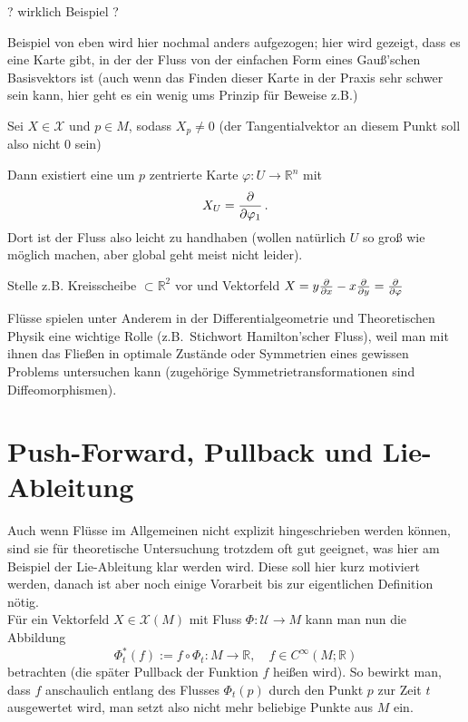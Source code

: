\documentclass[../H_Analysis_main.tex]{subfiles}
\begin{document}
\begin{bsp}
? wirklich Beispiel ?

Beispiel von eben wird hier nochmal anders aufgezogen; hier wird gezeigt, dass es eine Karte gibt, in der der Fluss von der einfachen Form eines Gauß'schen Basisvektors ist (auch wenn das Finden dieser Karte in der Praxis sehr schwer sein kann, hier geht es ein wenig ums Prinzip für Beweise z.B.)

Sei $X \in \mathcal{X}$ und $p \in M$, sodass $X_p \neq 0$ (der Tangentialvektor an diesem Punkt soll also nicht 0 sein)


Dann existiert eine um $p$ zentrierte Karte $\varphi: U \rightarrow \mathbb{R}^n$ mit
\begin{equation}
X_U = \pdv{\varphi_1} \, .
\end{equation}
Dort ist der Fluss also leicht zu handhaben (wollen natürlich $U$ so groß wie möglich machen, aber global geht meist nicht leider).


Stelle z.B. Kreisscheibe $\subset \mathbb{R}^2$ vor und Vektorfeld $X = y \pdv{x} - x \pdv{y} = \pdv{\varphi}$
\end{bsp}


Flüsse spielen unter Anderem in der Differentialgeometrie und Theoretischen Physik eine wichtige Rolle (z.B.~Stichwort Hamilton'scher Fluss), weil man mit ihnen das Fließen in optimale Zustände oder Symmetrien eines gewissen Problems untersuchen kann (zugehörige Symmetrietransformationen sind Diffeomorphismen).


\newpage


	\section{Push-Forward, Pullback und Lie-Ableitung}
Auch wenn Flüsse im Allgemeinen nicht explizit hingeschrieben werden können, sind sie für theoretische Untersuchung trotzdem oft gut geeignet, was hier am Beispiel der Lie-Ableitung klar werden wird. Diese soll hier kurz motiviert werden, danach ist aber noch einige Vorarbeit bis zur eigentlichen Definition nötig.\\

Für ein Vektorfeld $X \in \mathcal{X}(M)$ mit Fluss $\Phi: \mathcal{U} \rightarrow M$ kann man nun die Abbildung
\begin{equation*}
\Phi_t^*(f) := f \circ \Phi_t: M \rightarrow \mathbb{R}, \quad f \in C^\infty(M; \mathbb{R})
\end{equation*}
betrachten (die später Pullback der Funktion $f$ heißen wird). So bewirkt man, dass $f$ anschaulich entlang des Flusses $\Phi_t(p)$ durch den Punkt $p$ zur Zeit $t$ ausgewertet wird, man setzt also nicht mehr beliebige Punkte aus $M$ ein.
\end{document}
